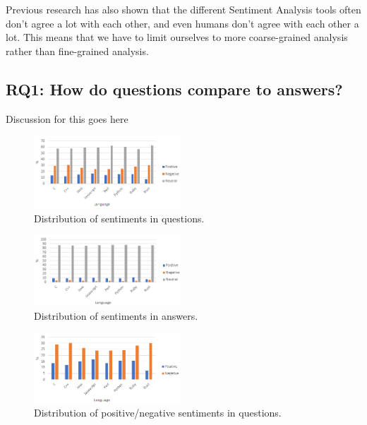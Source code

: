 \documentclass[conference]{IEEEtran}
\begin{document}
Previous research has also shown that the different Sentiment Analysis tools often don't agree a lot with each other, and even humans don't agree with each other a lot. This means that we have to limit ourselves to more coarse-grained analysis rather than fine-grained analysis\cite{b26, b35, b36}. \\

\subsection{RQ1: How do questions compare to answers?}
Discussion for this goes here

\begin{figure}[htbp]
\centerline{\includegraphics[width=0.49\textwidth]{figures/summNeutralQ.png}}
\caption{Distribution of sentiments in questions.}
\label{fig}
\end{figure}

\begin{figure}[htbp]
\centerline{\includegraphics[width=0.49\textwidth]{figures/summNeutralA.png}}
\caption{Distribution of sentiments in answers.}
\label{fig}
\end{figure}

\begin{figure}[htbp]
\centerline{\includegraphics[width=0.49\textwidth]{figures/summQ.png}}
\caption{Distribution of positive/negative sentiments in questions.}
\label{fig}
\end{figure}
\end{document}
